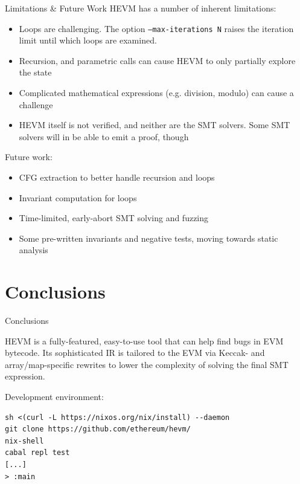 \documentclass[aspectratio=169]{beamer}
\begin{document}
\begin{frame}[fragile=singleslide]{Limitations \& Future Work}
HEVM has a number of inherent limitations:

\begin{itemize}
\item Loops are challenging. The option \texttt{--max-iterations N} raises the iteration limit until which loops are examined.
\item Recursion, and parametric calls can cause HEVM to only partially explore the state
\item Complicated mathematical expressions (e.g. division, modulo) can cause a challenge
\item HEVM itself is not verified, and neither are the SMT solvers. Some SMT solvers will in be able to emit a proof, though
\end{itemize}

Future work:
\begin{itemize}
\item CFG extraction to better handle recursion and loops
\item Invariant computation for loops
\item Time-limited, early-abort SMT solving and fuzzing
\item Some pre-written invariants and negative tests, moving towards static analysis
\end{itemize}
\end{frame}

\section{Conclusions}
\begin{frame}[fragile=singleslide]{Conclusions}

HEVM is a fully-featured, easy-to-use tool that can help find bugs in EVM bytecode. Its sophisticated IR is tailored to the EVM via Keccak- and array/map-specific rewrites to lower the complexity of solving the final SMT expression.
\bigskip


Development environment:
\begin{Verbatim}[frame=single, framerule=0.2mm, framesep=2mm,fontsize=\footnotesize]
sh <(curl -L https://nixos.org/nix/install) --daemon
git clone https://github.com/ethereum/hevm/
nix-shell
cabal repl test
[...]
> :main
\end{Verbatim}

\end{frame}
\end{document}
